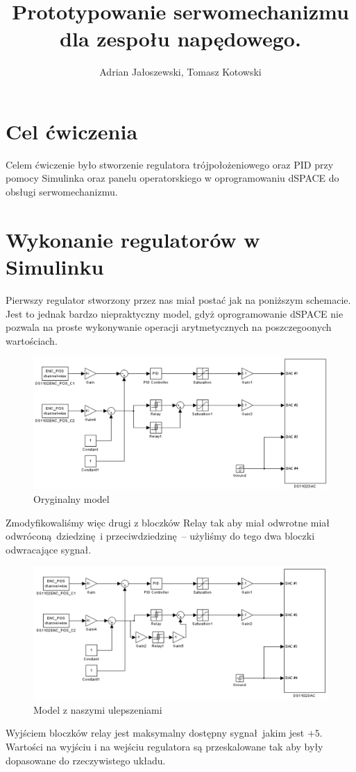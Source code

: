 \documentclass[a4paper, 12pt, titlepage]{article}
\title{Prototypowanie serwomechanizmu dla zespołu napędowego.}
\author{Adrian Jałoszewski, Tomasz Kotowski}
\date{}
\begin{document}
	\maketitle
	\section{Cel ćwiczenia}
		Celem ćwiczenie było stworzenie regulatora trójpołożeniowego oraz PID przy pomocy Simulinka oraz panelu operatorskiego w oprogramowaniu dSPACE do obsługi serwomechanizmu.
	\section{Wykonanie regulatorów w Simulinku}
		Pierwszy regulator stworzony przez nas miał postać jak na poniższym schemacie. Jest to jednak bardzo niepraktyczny model, gdyż oprogramowanie dSPACE nie pozwala na proste wykonywanie operacji arytmetycznych na poszczegoonych wartościach.
		\begin{figure}[H]
			\includegraphics[width=\textwidth]{img/original_system.png}
			\caption{Oryginalny model}
		\end{figure} \noindent
		Zmodyfikowaliśmy więc drugi z bloczków Relay tak aby miał odwrotne miał odwróconą dziedzinę i przeciwdziedzinę -- użyliśmy do tego dwa bloczki odwracające sygnał.
		\begin{figure}[H]
			\includegraphics[width=\textwidth]{img/our_improved_system.png}
			\caption{Model z naszymi ulepszeniami}
		\end{figure} \noindent
		Wyjściem bloczków relay jest maksymalny dostępny sygnał jakim jest $+5$. Wartości na wyjściu i na wejściu regulatora są przeskalowane tak aby były dopasowane do rzeczywistego układu.
\end{document}
